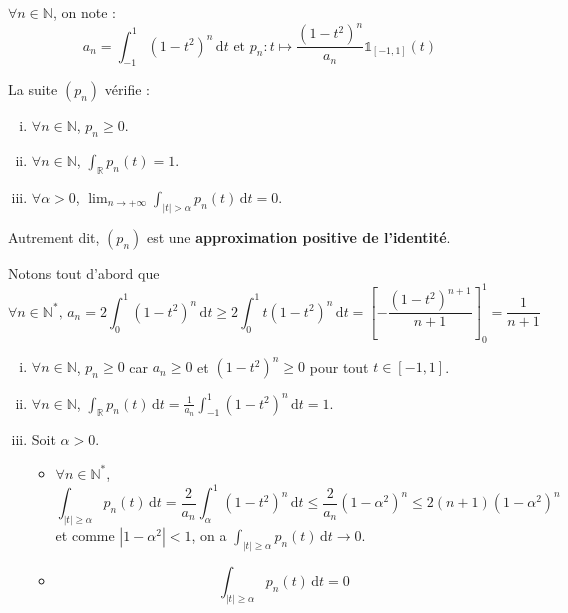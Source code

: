 





	\begin{notation}
		$\forall n \in \mathbb{N}$, on note :
		\[ a_n = \int_{-1}^1 (1-t^2)^n \, \mathrm{d}t \text{ et } p_n : t \mapsto \frac{(1-t^2)^n}{a_n} \mathbb{1}_{[-1, 1]}(t) \]
	\end{notation}

	\begin{lemma}
		\label{theoreme-de-weierstrass-par-la-convolution-1}
		La suite $(p_n)$ vérifie :
		\begin{enumerate}[(i)]
			\item $\forall n \in \mathbb{N}$, $p_n \geq 0$.
			\item $\forall n \in \mathbb{N}$, $\int_{\mathbb{R}} p_n(t) = 1$.
			\item $\forall \alpha > 0$, $\lim_{n \rightarrow +\infty} \int_{|t| > \alpha} p_n(t) \, \mathrm{d}t = 0$.
		\end{enumerate}
		Autrement dit, $(p_n)$ est une \textbf{approximation positive de l'identité}.
	\end{lemma}

	\begin{demonstration}
		Notons tout d'abord que
		\[ \forall n \in \mathbb{N}^*, \, a_n = 2 \int_0^1 (1-t^2)^n \, \mathrm{d}t \geq 2 \int_0^1 t (1-t^2)^n \, \mathrm{d}t = \left[ - \frac{(1-t^2)^{n+1}}{n+1} \right]_0^1 = \frac{1}{n+1}  \]
		\begin{enumerate}[(i)]
			\item $\forall n \in \mathbb{N}$, $p_n \geq 0$ car $a_n \geq 0$ et $(1-t^2)^n \geq 0$ pour tout $t \in [-1, 1]$.
			\item $\forall n \in \mathbb{N}$, $\int_{\mathbb{R}} p_n(t) \, \mathrm{d}t = \frac{1}{a_n} \int_{-1}^1 (1-t^2)^n \, \mathrm{d}t = 1$.
			\item Soit $\alpha > 0$.
			\begin{itemize}
				\item {} $\forall n \in \mathbb{N}^*$,
				\[ \int_{|t| \geq \alpha} p_n(t) \, \mathrm{d}t = \frac{2}{a_n} \int_\alpha^1 (1-t^2)^n \, \mathrm{d}t \leq \frac{2}{a_n} (1-\alpha^2)^n \leq 2(n+1)(1-\alpha^2)^n \]
				et comme $|1-\alpha^2| < 1$, on a $\int_{|t| \geq \alpha} p_n(t) \, \mathrm{d}t \longrightarrow 0$.
				\item {}
				\[ \int_{|t| \geq \alpha} p_n(t) \, \mathrm{d}t = 0 \]
			\end{itemize}
		\end{enumerate}
	\end{demonstration}

